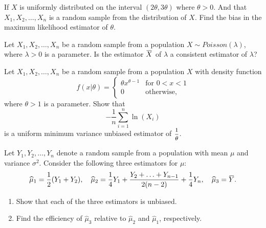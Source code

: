 \begin{mdframed}
    \vspace{-0.25cm}
    \hspace{-0.25cm}
    \begin{Exercise}
        If $X$ is uniformly distributed on the interval $(2\theta, 3\theta)$ where $\theta > 0$. 
        And that $X_1, X_2, \ldots, X_n$ is a random sample from the distribution of $X$.
        Find the bias in the maximum likelihood estimator of $\theta$.
    \end{Exercise}

    \begin{Exercise}
        Let $X_1, X_2, \ldots, X_n$ be a random sample from a population 
        $X \sim Poisson(\lambda)$, where $\lambda > 0$ is a parameter. Is the 
        estimator $\ols{X}$ of $\lambda$ a consistent estimator of $\lambda$?
    \end{Exercise}

    \begin{Exercise}
        Let $X_1, X_2, \ldots, X_n$ be a random sample from a population 
        $X$ with density function 
        \[
            f(x|\theta) = \begin{cases}
                \theta x^{\theta - 1} & \text{for } 0 < x < 1\\
                0 & \text{otherwise},
            \end{cases}
        \]
        where $\theta > 1$ is a parameter. Show that 
        \[
            -\frac{1}{n} \sum_{i=1}^{n} \ln(X_i) 
        \]
        is a uniform minimum variance unbiased estimator of $\mfrac{1}{\theta}$.
    \end{Exercise}

    \begin{Exercise}
        Let $Y_1, Y_2, \ldots, Y_n$ denote a random sample from a population with mean $\mu$ and 
        variance $\sigma^2$. Consider the following three estimators for $\mu$:
        \[
            \widehat{\mu}_1 = \frac{1}{2}(Y_1 + Y_2), \quad 
            \widehat{\mu}_2 = \frac{1}{4}Y_1 + \frac{Y_2 + \ldots + Y_{n-1}}{2(n-2)} + \frac{1}{4}Y_n, \quad 
            \widehat{\mu}_3 = \ols{Y}.
        \]
        \begin{enumerate}
            \item Show that each of the three estimators is unbiased.
            \item Find the efficiency of $\widehat{\mu}_3$ relative to $\widehat{\mu}_2$ and $\widehat{\mu}_1$, respectively.
        \end{enumerate}
    \end{Exercise}


\end{mdframed}
